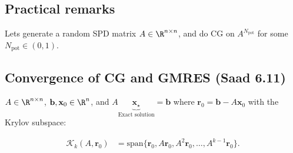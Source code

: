\subsection{Practical remarks}
Lets generate a random SPD matrix $A \in \R^{n \times n}$, and do CG on $A^{N_{\text{pot}}}$ for some $N_{\text{pot}} \in (0,1)$.


\subsection{Convergence of CG and GMRES (Saad 6.11)}
$A \in \R^{n \times n}$, $\mathbf{b}, \mathbf{x}_0 \in \R^n$, and $A \underbrace{\mathbf{x}_{\star}}_{\text{Exact solution}} = \mathbf{b}$ where $\mathbf{r}_0 = \mathbf{b} - A \mathbf{x}_0$ with the Krylov subspace:

\begin{align*}
    \mathcal{K}_k(A, \mathbf{r}_0) & = \text{span} \{\mathbf{r}_0, A \mathbf{r}_0, A^2 \mathbf{r}_0, \ldots, A^{k-1} \mathbf{r}_0\}.
\end{align*}